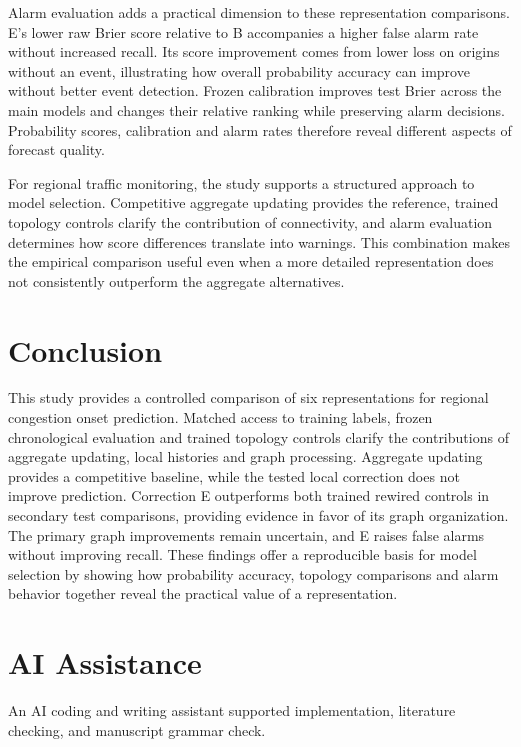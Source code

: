 \documentclass{llncs}
\begin{document}
Alarm evaluation adds a practical dimension to these representation comparisons. E's lower raw Brier score relative to B accompanies a higher false alarm rate without increased recall. Its score improvement comes from lower loss on origins without an event, illustrating how overall probability accuracy can improve without better event detection. Frozen calibration improves test Brier across the main models and changes their relative ranking while preserving alarm decisions. Probability scores, calibration and alarm rates therefore reveal different aspects of forecast quality.

For regional traffic monitoring, the study supports a structured approach to model selection. Competitive aggregate updating provides the reference, trained topology controls clarify the contribution of connectivity, and alarm evaluation determines how score differences translate into warnings. This combination makes the empirical comparison useful even when a more detailed representation does not consistently outperform the aggregate alternatives.


\section{Conclusion}
This study provides a controlled comparison of six representations for regional congestion onset prediction. Matched access to training labels, frozen chronological evaluation and trained topology controls clarify the contributions of aggregate updating, local histories and graph processing. Aggregate updating provides a competitive baseline, while the tested local correction does not improve prediction. Correction E outperforms both trained rewired controls in secondary test comparisons, providing evidence in favor of its graph organization. The primary graph improvements remain uncertain, and E raises false alarms without improving recall. These findings offer a reproducible basis for model selection by showing how probability accuracy, topology comparisons and alarm behavior together reveal the practical value of a representation.




\section*{AI Assistance}
An AI coding and writing assistant supported implementation, literature checking, and manuscript grammar check.
\end{document}
